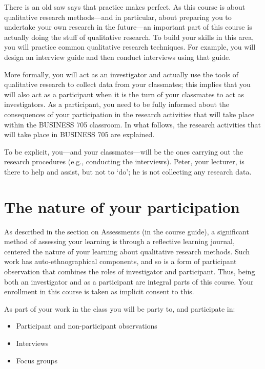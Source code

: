 \documentclass[]{book}
\providecommand{\tightlist}{%
  \setlength{\itemsep}{0pt}\setlength{\parskip}{0pt}}
\theoremstyle{definition}
\theoremstyle{definition}
\theoremstyle{definition}
\theoremstyle{remark}
\begin{document}
There is an old saw says that practice makes perfect. As this course is
about qualitative research methods---and in particular, about preparing
you to undertake your own research in the future---an important part of
this course is actually doing the stuff of qualitative research. To
build your skills in this area, you will practice common qualitative
research techniques. For example, you will design an interview guide and
then conduct interviews using that guide.

More formally, you will act as an investigator and actually use the
tools of qualitative research to collect data from your classmates; this
implies that you will also act as a participant when it is the turn of
your classmates to act as investigators. As a participant, you need to
be fully informed about the consequences of your participation in the
research activities that will take place within the BUSINESS 705
classroom. In what follows, the research activities that will take place
in BUSINESS 705 are explained.

To be explicit, you---and your classmates---will be the ones carrying
out the research procedures (e.g., conducting the interviews). Peter,
your lecturer, is there to help and assist, but not to `do'; he is not
collecting any research data.

\hypertarget{the-nature-of-your-participation}{%
\section{The nature of your
participation}\label{the-nature-of-your-participation}}

As described in the section on Assessments (in the course guide), a
significant method of assessing your learning is through a reflective
learning journal, centered the nature of your learning about qualitative
research methods. Such work has auto-ethnographical components, and so
is a form of participant observation that combines the roles of
investigator and participant. Thus, being both an investigator and as a
participant are integral parts of this course. Your enrollment in this
course is taken as implicit consent to this.

As part of your work in the class you will be party to, and participate
in:

\begin{itemize}
\tightlist
\item
  Participant and non-participant observations
\item
  Interviews
\item
  Focus groups
\end{itemize}
\end{document}
